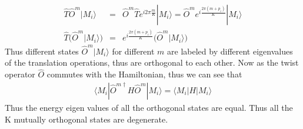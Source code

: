 \documentclass[reprint,prb,superscriptaddress]{revtex4-2}
\begin{document}
\begin{eqnarray}
\hat{T} \hat{O}^m |M_i\rangle &=& \hat{O}^m \hat{T} e^{i2\pi \frac{m}{K}} |M_i\rangle =\hat{O}^m e^{i \frac{2\pi(m+p_i)}{K} } |M_i\rangle \nonumber\\
\hat{T} \bigg(\hat{O}^m |M_i\rangle \bigg) &=&  e^{i \frac{2\pi(m+p_i)}{K} } \bigg( \hat{O}^m |M_i\rangle \bigg)
\end{eqnarray}
Thus different states $ \hat{O}^m |M_i\rangle$ for different $m$ are labeled by different eigenvalues of the translation operations, thus are orthogonal to each other. Now as the twist operator $\hat{O}$ commutes with the Hamiltonian, thus we can see that 
\begin{eqnarray}
\langle M_i| \hat{O}^{m \dagger}  H \hat{O}^m |M_i\rangle =\langle M_i|  H |M_i\rangle 
\end{eqnarray}
Thus the energy eigen values of all the orthogonal states are equal. Thus all the K mutually orthogonal states are degenerate.
\end{document}
